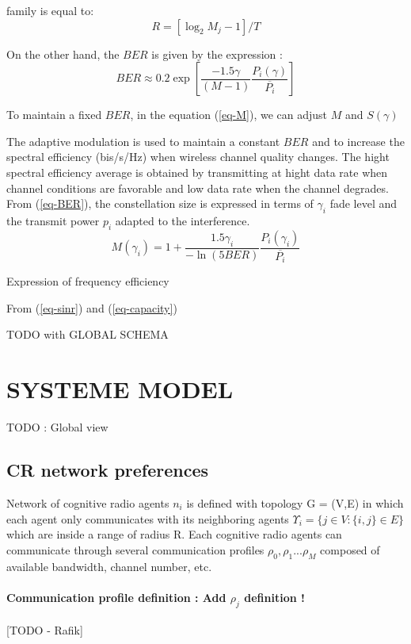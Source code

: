 \documentclass[conference]{IEEEtran}
\begin{document}
\cite{Goldsmith1998} family is equal to:
\[R=[\log_{2}M_{j}-1]/T
\]

On the other hand, the $BER$ is given by the expression \cite{Goldsmith1997} :
\begin{equation}
\label{eq-BER}
BER\approx0.2\exp\left[\frac{-1.5\gamma}{(M-1)}\frac{P_{i}(\gamma)}{\overline{P_{i}}}\right]
\end{equation}
 

To maintain a fixed $BER$, in the equation (\ref{eq-M}), we can adjust $M$ and $S(\gamma)$

The adaptive modulation is used to maintain a constant $BER$ and to increase the spectral efficiency (bis/s/Hz) when wireless channel quality changes. The hight spectral efficiency average is obtained by transmitting at hight data rate when channel conditions are favorable and low data rate when the channel degrades. From (\ref{eq-BER}), the constellation size is expressed in terms of  $\gamma_{i}$ fade level and the transmit power $p_{i}$ adapted to the interference. 
\begin{equation}
\label{eq-M}
M(\gamma_{i})=1+\frac{1.5\gamma_{i}}{-\ln(5BER)}
 \frac{P_{i}(\gamma_{i})}{\overline{P_{i}}}
\end{equation}

Expression of frequency efficiency 
 
From (\ref{eq-sinr}) and (\ref{eq-capacity})
 



TODO with GLOBAL SCHEMA

\section{SYSTEME MODEL}
TODO : Global view \\

\subsection{CR network preferences}
Network of cognitive radio agents $n_i$ is defined with topology G = (V,E) in which each agent only communicates with its neighboring agents $\Upsilon_i = \{j \in V : \{i,j\} \in E\}$ which are inside a range of radius R. Each cognitive radio agents can communicate through several communication profiles $\rho_0, \rho_1 ... \rho_M$ composed of available bandwidth, channel number, etc.

\paragraph*{Communication profile definition  : Add $\rho_j$ definition !}[TODO - Rafik] \\
\end{document}

